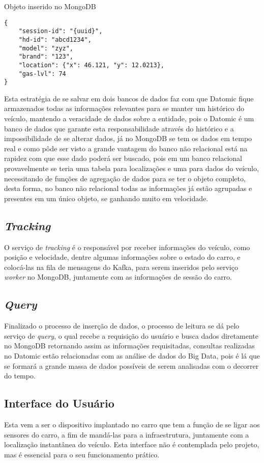 \begin{quadro}
\caption{\label{qdr:worker}Objeto inserido no MongoDB}
\begin{lstlisting}
{
	"session-id": "{uuid}",
	"hd-id": "abcd1234",
	"model": "zyz",
	"brand": "123",
	"location": {"x": 46.121, "y": 12.0213},
	"gas-lvl": 74
}
\end{lstlisting}
\end{quadro}

Esta estratégia de se salvar em dois bancos de dados faz com que Datomic fique armazenados todas as informações relevantes para se manter um histórico do veículo, mantendo a veracidade de dados sobre a entidade, pois o Datomic é um banco de dados que garante esta responsabilidade através do histórico e a impossibilidade de se alterar dados, já no MongoDB se tem os dados em tempo real e como pôde ser visto a grande vantagem do banco não relacional está na rapidez com que esse dado poderá ser buscado, pois em um banco relacional provavelmente se teria uma tabela para localizações e uma para dados do veículo, necessitando de funções de agregação de dados para se ter o objeto completo, desta forma, no banco não relacional todas as informações já estão agrupadas e presentes em um único objeto, se ganhando muito em velocidade.

\subsection{\textit{Tracking}}
O serviço de \textit{tracking} é o responsável por receber informações do veículo, como posição e velocidade, dentre algumas informações sobre o estado do carro, e colocá-las na fila de mensagens do Kafka, para serem inseridos pelo serviço \textit{worker} no MongoDB, juntamente com as informações de sessão do carro. 

\subsection{\textit{Query}}
Finalizado o processo de inserção de dados, o processo de leitura se dá pelo serviço de \textit{query}, o qual recebe a requisição do usuário e busca dados diretamente no MongoDB retornando assim as informações requisitadas, consultas realizadas no Datomic estão relacionadas com as análise de dados do Big Data, pois é lá que se formará a grande massa de dados possíveis de serem analisadas com o decorrer do tempo.

\subsection{Interface do Usuário}
Esta vem a ser o dispositivo implantado no carro que tem a função de se ligar aos sensores do carro, a fim de mandá-las para a infraestrutura, juntamente com a localização instantânea do veículo. Esta interface não é contemplada pelo projeto, mas é essencial para o seu funcionamento prático.

